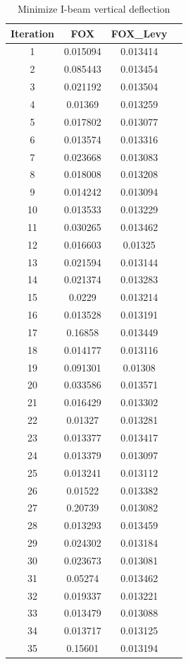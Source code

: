 \documentclass[
]{article}
\begin{document}
\begin{justify}
{\begin{table}[htbp]
\centering
\caption{Minimize I-beam vertical deflection}
\label{tab:fox_results}
\begin{tabular}{cccc}
\toprule
Iteration & FOX & FOX\_Levy & \\
\midrule
1 & 0.015094 & 0.013414 \\
2 & 0.085443 & 0.013454 \\
3 & 0.021192 & 0.013504 \\
4 & 0.01369 & 0.013259 \\
5 & 0.017802 & 0.013077 \\
6 & 0.013574 & 0.013316 \\
7 & 0.023668 & 0.013083 \\
8 & 0.018008 & 0.013208 \\
9 & 0.014242 & 0.013094 \\
10 & 0.013533 & 0.013229 \\
11 & 0.030265 & 0.013462 \\
12 & 0.016603 & 0.01325 \\
13 & 0.021594 & 0.013144 \\
14 & 0.021374 & 0.013283 \\
15 & 0.0229 & 0.013214 \\
16 & 0.013528 & 0.013191 \\
17 & 0.16858 & 0.013449 \\
18 & 0.014177 & 0.013116 \\
19 & 0.091301 & 0.01308 \\
20 & 0.033586 & 0.013571 \\
21 & 0.016429 & 0.013302 \\
22 & 0.01327 & 0.013281 \\
23 & 0.013377 & 0.013417 \\
24 & 0.013379 & 0.013097 \\
25 & 0.013241 & 0.013112 \\
26 & 0.01522 & 0.013382 \\
27 & 0.20739 & 0.013082 \\
28 & 0.013293 & 0.013459 \\
29 & 0.024302 & 0.013184 \\
30 & 0.023673 & 0.013081 \\
31 & 0.05274 & 0.013462 \\
32 & 0.019337 & 0.013221 \\
33 & 0.013479 & 0.013088 \\
34 & 0.013717 & 0.013125 \\
35 & 0.15601 & 0.013194 \\

\end{tabular}
\end{table}}
\end{justify}
\end{document}
